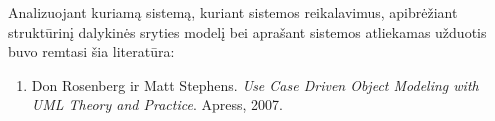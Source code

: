 \documentclass{VUMIFPSkursinis}
\begin{document}
        Analizuojant kuriamą sistemą, kuriant sistemos reikalavimus, apibrėžiant struktūrinį dalykinės sryties modelį bei aprašant sistemos atliekamas užduotis buvo remtasi šia literatūra:
            \begin{enumerate}
                \item Don Rosenberg ir Matt Stephens. \textit{Use Case Driven Object Modeling with UML Theory and Practice}. Apress, 2007.
            \end{enumerate}
      
    
\end{document}
